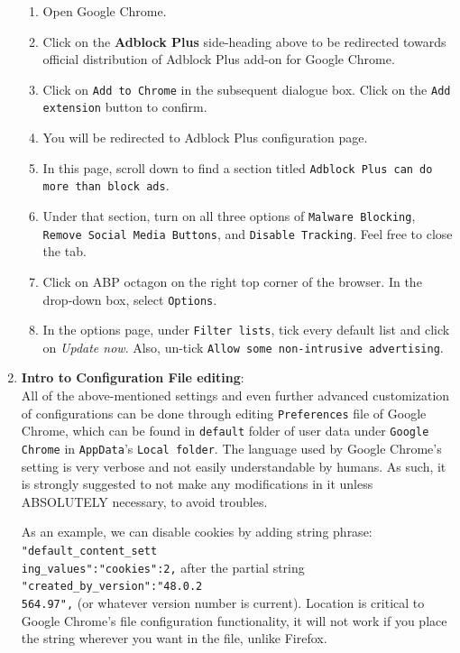 \documentclass[12pt]{extarticle}
\begin{document}
\begin{enumerate}
	\begin{enumerate}
		\item Open Google Chrome.
		\item Click on the \textbf{Adblock Plus} side-heading above to be redirected towards official distribution of Adblock Plus add-on for Google Chrome.
		\item Click on \texttt{Add to Chrome} in the subsequent dialogue box. Click on the \texttt{Add extension} button to confirm.
		\item You will be redirected to Adblock Plus configuration page.
		\item In this page, scroll down to find a section titled \texttt{Adblock Plus can do more than block ads}.
		\item Under that section, turn on all three options of \texttt{Malware Blocking}, \texttt{Remove Social Media Buttons}, and \texttt{Disable Tracking}. Feel free to close the tab.
		\item Click on ABP octagon on the right top corner of the browser. In the drop-down box, select \texttt{Options}.
		\item In the options page, under \texttt{Filter lists}, tick every default list and click on \textit{Update now}. Also, un-tick \texttt{Allow some non-intrusive advertising}.
	\end{enumerate} 
	
	\vspace{2mm}
	\noindent
	\item 	\textbf{Intro to Configuration File editing}:\\
	All of the above-mentioned settings and even further advanced customization of configurations can be done through editing \texttt{Preferences} file of Google Chrome, which can be found in \texttt{default} folder of user data under \texttt{Google Chrome} in \texttt{AppData}'s \texttt{Local folder}. The language used by Google Chrome's setting is very verbose and not easily understandable by humans. As such, it is strongly suggested to not make any modifications in it unless ABSOLUTELY necessary, to avoid troubles. 

	
	\vspace{2mm}
	\noindent
	As an example, we can disable cookies by adding string phrase: \texttt{"default\_content\_sett\\ing\_values":{"cookies":2},} after the partial string \texttt{"created\_by\_version":"48.0.2\\564.97",} (or whatever version number is current). Location is critical to Google Chrome's file configuration functionality, it will not work if you place the string wherever you want in the file, unlike Firefox.
	
	\end{enumerate}
	
\end{document}
